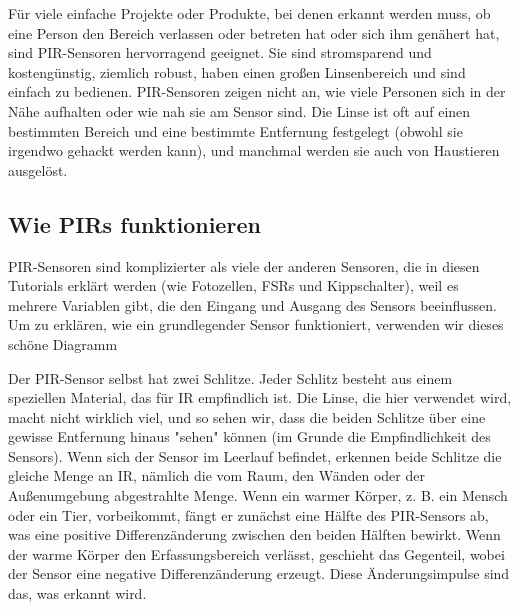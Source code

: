 \documentclass[conference]{IEEEtran}
\begin{document}
Für viele einfache Projekte oder Produkte, bei denen erkannt werden muss, ob eine Person den Bereich verlassen oder betreten hat oder sich ihm genähert hat, sind PIR-Sensoren hervorragend geeignet. Sie sind stromsparend und kostengünstig, ziemlich robust, haben einen großen Linsenbereich und sind einfach zu bedienen.  PIR-Sensoren zeigen nicht an, wie viele Personen sich in der Nähe aufhalten oder wie nah sie am Sensor sind. Die Linse ist oft auf einen bestimmten Bereich und eine bestimmte Entfernung festgelegt (obwohl sie irgendwo gehackt werden kann), und manchmal werden sie auch von Haustieren ausgelöst.

\subsection{Wie PIRs funktionieren}
PIR-Sensoren sind komplizierter als viele der anderen Sensoren, die in diesen Tutorials erklärt werden (wie Fotozellen, FSRs und Kippschalter), weil es mehrere Variablen gibt, die den Eingang und Ausgang des Sensors beeinflussen. Um zu erklären, wie ein grundlegender Sensor funktioniert, verwenden wir dieses schöne Diagramm

Der PIR-Sensor selbst hat zwei Schlitze. Jeder Schlitz besteht aus einem speziellen Material, das für IR empfindlich ist. Die Linse, die hier verwendet wird, macht nicht wirklich viel, und so sehen wir, dass die beiden Schlitze über eine gewisse Entfernung hinaus "sehen" können (im Grunde die Empfindlichkeit des Sensors). Wenn sich der Sensor im Leerlauf befindet, erkennen beide Schlitze die gleiche Menge an IR, nämlich die vom Raum, den Wänden oder der Außenumgebung abgestrahlte Menge. Wenn ein warmer Körper, z. B. ein Mensch oder ein Tier, vorbeikommt, fängt er zunächst eine Hälfte des PIR-Sensors ab, was eine positive Differenzänderung zwischen den beiden Hälften bewirkt. Wenn der warme Körper den Erfassungsbereich verlässt, geschieht das Gegenteil, wobei der Sensor eine negative Differenzänderung erzeugt. Diese Änderungsimpulse sind das, was erkannt wird.
\end{document}
